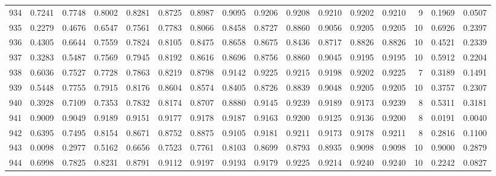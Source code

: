 \begin{tabular}{lrrrrrrrrrrrrrrr}
934 &      0.7241 &  0.7748 &  0.8002 &  0.8281 &  0.8725 &  0.8987 &  0.9095 &  0.9206 &  0.9208 &  0.9210 &   0.9202 &     0.9210 &      9 &                    0.1969 &                     0.0507 \\
935 &      0.2279 &  0.4676 &  0.6547 &  0.7561 &  0.7783 &  0.8066 &  0.8458 &  0.8727 &  0.8860 &  0.9056 &   0.9205 &     0.9205 &     10 &                    0.6926 &                     0.2397 \\
936 &      0.4305 &  0.6644 &  0.7559 &  0.7824 &  0.8105 &  0.8475 &  0.8658 &  0.8675 &  0.8436 &  0.8717 &   0.8826 &     0.8826 &     10 &                    0.4521 &                     0.2339 \\
937 &      0.3283 &  0.5487 &  0.7569 &  0.7945 &  0.8192 &  0.8616 &  0.8696 &  0.8756 &  0.8860 &  0.9045 &   0.9195 &     0.9195 &     10 &                    0.5912 &                     0.2204 \\
938 &      0.6036 &  0.7527 &  0.7728 &  0.7863 &  0.8219 &  0.8798 &  0.9142 &  0.9225 &  0.9215 &  0.9198 &   0.9202 &     0.9225 &      7 &                    0.3189 &                     0.1491 \\
939 &      0.5448 &  0.7755 &  0.7915 &  0.8176 &  0.8604 &  0.8574 &  0.8405 &  0.8726 &  0.8839 &  0.9048 &   0.9205 &     0.9205 &     10 &                    0.3757 &                     0.2307 \\
940 &      0.3928 &  0.7109 &  0.7353 &  0.7832 &  0.8174 &  0.8707 &  0.8880 &  0.9145 &  0.9239 &  0.9189 &   0.9173 &     0.9239 &      8 &                    0.5311 &                     0.3181 \\
941 &      0.9009 &  0.9049 &  0.9189 &  0.9151 &  0.9177 &  0.9178 &  0.9187 &  0.9163 &  0.9200 &  0.9125 &   0.9136 &     0.9200 &      8 &                    0.0191 &                     0.0040 \\
942 &      0.6395 &  0.7495 &  0.8154 &  0.8671 &  0.8752 &  0.8875 &  0.9105 &  0.9181 &  0.9211 &  0.9173 &   0.9178 &     0.9211 &      8 &                    0.2816 &                     0.1100 \\
943 &      0.0098 &  0.2977 &  0.5162 &  0.6656 &  0.7523 &  0.7761 &  0.8103 &  0.8699 &  0.8793 &  0.8935 &   0.9098 &     0.9098 &     10 &                    0.9000 &                     0.2879 \\
944 &      0.6998 &  0.7825 &  0.8231 &  0.8791 &  0.9112 &  0.9197 &  0.9193 &  0.9179 &  0.9225 &  0.9214 &   0.9240 &     0.9240 &     10 &                    0.2242 &                     0.0827 \\

\end{tabular}
